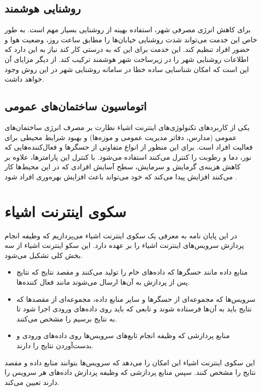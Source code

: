     \subsection{روشنایی هوشمند}
      برای کاهش انرژی مصرفی شهر، استفاده بهینه از روشنایی بسیار مهم است.
      به طور خاص این خدمت می‌تواند شدت روشنایی خیابان‌ها را مطابق ساعت روز، وضعیت هوا و حضور افراد تنظیم کند.
      این خدمت برای این که به درستی کار کند نیاز به این دارد که اطلاعات روشنایی شهر را در زیرساخت شهر هوشمند ترکیب کند.
      از دیگر مزایای آن این است که امکان شناسایی ساده خطا در سامانه روشنایی شهر در این روش وجود خواهد داشت.

    \subsection{اتوماسیون ساختمان‌های عمومی}
      یکی از کاربرد‌های تکنولوژی‌های اینترنت اشیاء نظارت بر مصرف انرژی ساختمان‌های عمومی (مدارس، دفاتر مدیریت عمومی و موزه‌ها) و بهبود شرایط محیطی برای فعالیت افراد است.
      برای این منظور از انواع متفاوتی از حسگر‌ها و فعال‌کننده‌هایی که نور، دما و رطوبت را کنترل می‌کنند استفاده می‌شود.
      با کنترل این پارامتر‌ها، علاوه بر کاهش هزینه‌ی گرمایش و سرمایش، سطح آسایش افرادی که در این محیط‌ها کار می‌کنند افزایش پیدا می‌کند که خود می‌تواند باعث افزایش بهره‌وری افراد شود \cite{lee2008intelligent}.

  \section{سکوی اینترنت اشیاء}
    در این پایان نامه به معرفی یک سکوی اینترنت اشیاء می‌پردازیم که وظیفه انجام پردازش سرویس‌های اینترنت اشیاء را بر عهده دارد.
    این سکو اینترنت اشیاء از سه بخش کلی تشکیل می‌شود.
    \begin{itemize}
      \item
        منابع داده مانند حسگر‌ها که داده‌های خام را تولید می‌کنند و مقصد نتایج که نتایج پس از پردازش به آن‌ها ارسال می‌شوند مانند فعال کننده‌ها.

      \item
        سرویس‌ها که مجموعه‌ای از حسگر‌ها و سایر منابع داده، مجموعه‌ای از مقصد‌ها که نتایج باید به آن‌ها فرستاده شوند و تابعی که باید روی داده‌های ورودی اجرا شود تا به نتایج برسیم را مشخص می‌کنند.

      \item
        منابع پردازشی که وظیفه انجام تابع‌های سرویس‌ها روی داده‌های ورودی و بدست‌آوردن نتایج را دارند.

    \end{itemize}
    این سکوی اینترنت اشیاء این امکان را می‌دهد که سرویس‌ها بتوانند منابع داده‌ و مقصد نتایج را مشخص کنند.
    سپس منابع پردازشی که وظیفه پردازش داده‌های هر سرویس را دارند تعیین می‌کند.

